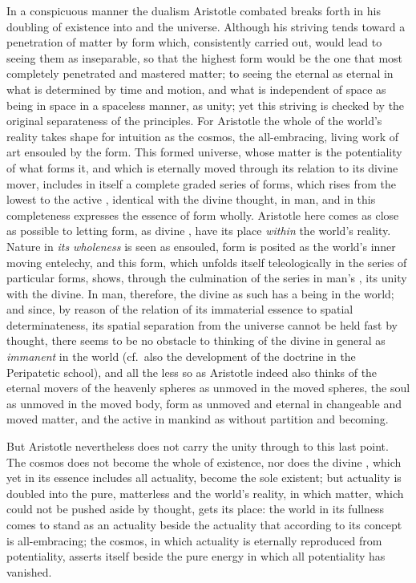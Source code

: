 In a conspicuous manner the dualism Aristotle combated breaks forth in
his doubling of existence into  and the universe. Although his
striving tends toward a penetration of matter by form which, consistently
carried out, would lead to seeing them as inseparable, so that the
highest form would be the one that most completely penetrated and
mastered matter; to seeing the eternal as eternal in what is determined
by time and motion, and what is independent of space as being in space in
a spaceless manner, as unity; yet this striving is checked by the
original separateness of the principles. For Aristotle the whole of the
world's reality takes shape for intuition as the cosmos, the
all-embracing, living work of art ensouled by the form. This formed
universe, whose matter is the potentiality of what forms it, and which is
eternally moved through its relation to its divine mover, includes in
itself a complete graded series of forms, which rises from the lowest to
the active , identical with the divine thought, in
man, and in this completeness expresses the essence of form wholly.
Aristotle here comes as close as possible to letting form, as divine
, have its place \emph{within} the world's reality. Nature in
\emph{its wholeness} is seen as ensouled, form is posited as the world's
inner moving entelechy, and this form, which unfolds itself
teleologically in the series of particular forms, shows, through the
culmination of the series in man's , its unity with the divine.
In man, therefore, the divine  as such has a being in the world;
and since, by reason of the relation of its immaterial essence to spatial
determinateness, its spatial separation from the universe cannot be held
fast by thought, there seems to be no obstacle to thinking of the divine
 in general as \emph{immanent} in the world (cf.\ also the
development of the doctrine in the Peripatetic school), and all the less
so as Aristotle indeed also thinks of the eternal movers of the heavenly
spheres as unmoved in the moved spheres, the soul as unmoved in the moved
body, form as unmoved and eternal in changeable and moved matter, and the
active  in mankind as without partition and becoming.

But Aristotle nevertheless does not carry the unity through to this last
point. The cosmos does not become the whole of existence, nor does the
divine , which yet in its essence includes all actuality, become
the sole existent; but actuality is doubled into the pure, matterless
 and the world's reality, in which matter, which could not be
pushed aside by thought, gets its place: the world in its fullness comes
to stand as an actuality beside the actuality that according to its
concept is all-embracing; the cosmos, in which actuality is eternally
reproduced from potentiality, asserts itself beside the pure energy in
which all potentiality has vanished.

